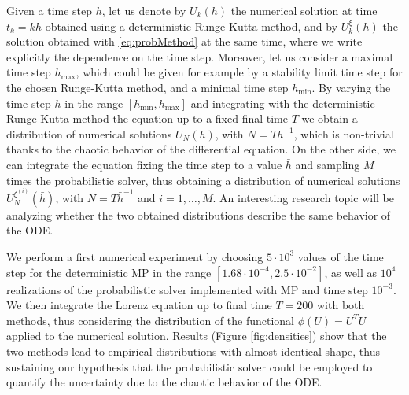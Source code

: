 Given a time step $h$, let us denote by $U_k(h)$ the numerical solution at time $t_k = kh$ obtained using a deterministic Runge-Kutta method, and by $U_k^\xi(h)$ the solution obtained with \eqref{eq:probMethod} at the same time, where we write explicitly the dependence on the time step. Moreover, let us consider a maximal time step $h_{\max}$, which could be given for example by a stability limit time step for the chosen Runge-Kutta method, and a minimal time step $h_{\min}$. By varying the time step $h$ in the range $[h_{\min}, h_{\max}]$ and integrating with the deterministic Runge-Kutta method the equation up to a fixed final time $T$ we obtain a distribution of numerical solutions $U_N(h)$, with $N = Th^{-1}$, which is non-trivial thanks to the chaotic behavior of the differential equation. On the other side, we can integrate the equation fixing the time step to a value $\bar h$ and sampling $M$ times the probabilistic solver, thus obtaining a distribution of numerical solutions $U_N^{\xi^{(i)}}(\bar h)$, with $N = T\bar h^{-1}$ and $i = 1, \ldots, M$. An interesting research topic will be analyzing whether the two obtained distributions describe the same behavior of the ODE. 

We perform a first numerical experiment by choosing $5 \cdot 10^3$ values of the time step for the deterministic MP in the range $[1.68 \cdot 10^{-4}, 2.5 \cdot 10^{-2}]$, as well as $10^4$ realizations of the probabilistic solver implemented with MP and time step $10^{-3}$. We then integrate the Lorenz equation up to final time $T = 200$ with both methods, thus considering the distribution of the functional $\phi(U) = U^TU$ applied to the numerical solution. Results (Figure \ref{fig:densities}) show that the two methods lead to empirical distributions with almost identical shape, thus sustaining our hypothesis that the probabilistic solver could be employed to quantify the uncertainty due to the chaotic behavior of the ODE. 

